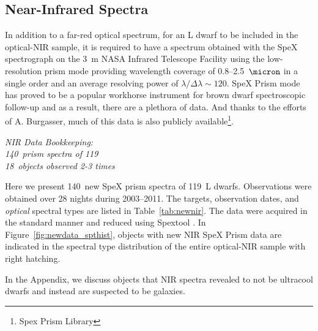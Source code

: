\documentclass[12pt,preprint]{aastex}
\newcommand{\prismspectra}{140} %
\newcommand{\dupes}{18} %
\newcommand{\objects}{119} %
\begin{document}
\subsection{Near-Infrared Spectra}

In addition to a far-red optical spectrum, for an L dwarf to be included in the optical-NIR sample, it is required to have a spectrum obtained with the SpeX spectrograph \citep{Spex} on the 3~m NASA Infrared Telescope Facility using the low-resolution prism mode providing wavelength coverage of 0.8--2.5~$\micron$ in a single order and an average resolving power of $\lambda/\Delta\lambda\sim120$.
SpeX Prism mode has proved to be a popular workhorse instrument for brown dwarf spectroscopic follow-up and as a result, there are a plethora of data. And thanks to the efforts of A. Burgasser, much of this data is also publicly available\footnote{Spex Prism Library}. 

\label{sec:obs_new_nir}

\emph{NIR Data Bookkeeping: \\
\prismspectra~prism spectra of \objects \\
\dupes~objects observed 2-3 times}

Here we present \prismspectra~new SpeX prism spectra of \objects~L dwarfs. 
Observations were obtained over 28 nights during 2003--2011. The targets, observation dates, and \emph{optical} spectral types are listed in Table~\ref{tab:newnir}. 
The data were acquired in the standard manner and reduced using Spextool \citep{Cushing04,Spextool2}.
In Figure~\ref{fig:newdata_spthist}, objects with new NIR SpeX Prism data are indicated in the spectral type distribution of the entire optical-NIR sample with right hatching.

In the Appendix, we discuss objects that NIR spectra revealed to not be ultracool dwarfs and instead are suspected to be galaxies.

\end{document}
